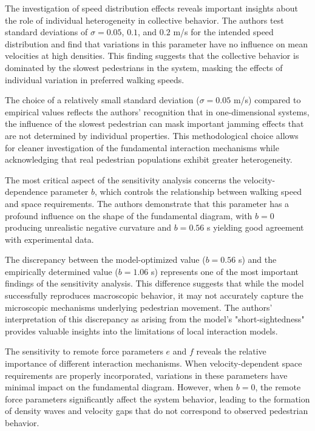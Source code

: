 \documentclass[12pt,a4paper]{article}
\begin{document}
The investigation of speed distribution effects reveals important insights about the role of individual heterogeneity in collective behavior. The authors test standard deviations of $\sigma = 0.05$, $0.1$, and $0.2$ m/s for the intended speed distribution and find that variations in this parameter have no influence on mean velocities at high densities. This finding suggests that the collective behavior is dominated by the slowest pedestrians in the system, masking the effects of individual variation in preferred walking speeds.

The choice of a relatively small standard deviation ($\sigma = 0.05$ m/s) compared to empirical values reflects the authors' recognition that in one-dimensional systems, the influence of the slowest pedestrian can mask important jamming effects that are not determined by individual properties. This methodological choice allows for cleaner investigation of the fundamental interaction mechanisms while acknowledging that real pedestrian populations exhibit greater heterogeneity.

The most critical aspect of the sensitivity analysis concerns the velocity-dependence parameter $b$, which controls the relationship between walking speed and space requirements. The authors demonstrate that this parameter has a profound influence on the shape of the fundamental diagram, with $b = 0$ producing unrealistic negative curvature and $b = 0.56$ s yielding good agreement with experimental data.

The discrepancy between the model-optimized value ($b = 0.56$ s) and the empirically determined value ($b = 1.06$ s) represents one of the most important findings of the sensitivity analysis. This difference suggests that while the model successfully reproduces macroscopic behavior, it may not accurately capture the microscopic mechanisms underlying pedestrian movement. The authors' interpretation of this discrepancy as arising from the model's "short-sightedness" provides valuable insights into the limitations of local interaction models.

The sensitivity to remote force parameters $e$ and $f$ reveals the relative importance of different interaction mechanisms. When velocity-dependent space requirements are properly incorporated, variations in these parameters have minimal impact on the fundamental diagram. However, when $b = 0$, the remote force parameters significantly affect the system behavior, leading to the formation of density waves and velocity gaps that do not correspond to observed pedestrian behavior.
\end{document}
